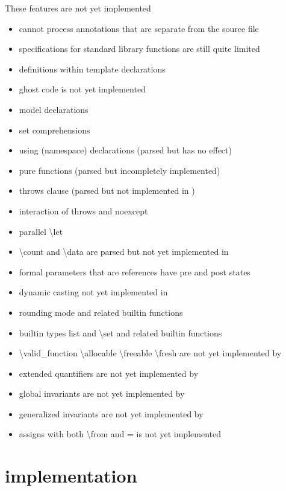 These \acslpp features are not yet implemented
\begin{itemize}

\item \fclang cannot process annotations that are separate from the source file
\item \acslpp specifications for standard \cpp library functions are still quite limited
\item \acslpp definitions within template declarations
\item ghost code is not yet implemented
\item model declarations
\item set comprehensions
\item using (namespace) declarations (parsed but has no effect)
\item pure functions (parsed but incompletely implemented)
\item throws clause (parsed but not implemented in \framac)
\item interaction of throws and noexcept
\item parallel \textbackslash let
\item \textbackslash count and \textbackslash data are parsed but not yet implemented in \framac
\item formal parameters that are references have pre and post states
\item dynamic casting not yet implemented in \framac
\item rounding mode  and related builtin functions
\item builtin types list and \textbackslash set and related builtin functions
\item \textbackslash valid\_function \textbackslash allocable \textbackslash freeable \textbackslash fresh are not yet implemented by \framac
\item extended quantifiers are not yet implemented by \framac
\item global invariants are not yet implemented by \framac
\item generalized invariants are not yet implemented by \framac
\item assigns with both \textbackslash from and = is not yet implemented
\end{itemize}

\section{\acslpp implementation}

